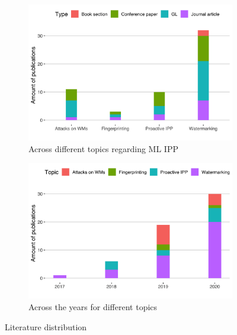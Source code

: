 \begin{figure} 
 \centering
 \begin{subfigure}[b]{0.48\linewidth}
 \includegraphics[width =\linewidth]{images/literature_types.png}
 \caption{Across different topics regarding ML IPP}
 \label{fig:aufteilung}
 \end{subfigure}
 \hfill
 \begin{subfigure}[b]{0.48\linewidth}
 \includegraphics[width = \linewidth]{images/literature_years.png}
 \caption{Across the years for different topics}
 \label{fig:aufteilung-jahre}
 \end{subfigure}
 \caption{Literature distribution}
 \end{figure}


